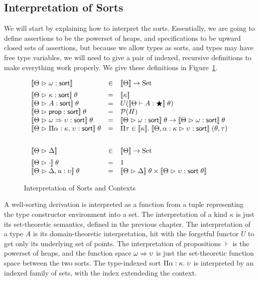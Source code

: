 \subsection{Interpretation of Sorts}

We will start by explaining how to interpret the sorts. Essentially,
we are going to define assertions to be the powerset of heaps, and
specifications to be upward closed sets of assertions, but because we
allow types as sorts, and types may have free type variables, we will
need to give a pair of indexed, recursive definitions to make
everything work properly. We give these definitions in
Figure~\ref{sort-interpretation}. 

\begin{figure}
\begin{displaymath}
  \begin{array}{lcl}
    \interp{\judgeSort{\omega}} & \in & \interp{\Theta} \to \mathrm{Set} \\[0.5em]
    \interp{\judgeSort{\kappa}} \;\theta
    & = & \interp{\kappa} 
    \\
    \interp{\judgeSort{A}}\;\theta
    & = & U(\interp{\judgeWK{A}{\bigstar}}\;\theta)
    \\
    \interp{\judgeSort{\assert}}\;\theta
    & = & \powerset{H}
    \\
    \interp{\judgeSort{\omega \To \upsilon}}\;\theta
    & = & \interp{\judgeSort{\omega}}\;\theta \to \interp{\judgeSort{\omega}}\;\theta
    \\
    \interp{\judgeSort{\forallsort{\alpha}{\kappa}{\upsilon}}}\;\theta
    & = & \Pi \tau \in \interp{\kappa}.\;\interp{\judgeSort[\Theta, \alpha:\kappa]{\upsilon}}\;(\theta,\tau)
    \\[2em]
    \interp{\judgeACtx{\Delta}} & \in & \interp{\Theta} \to \mathrm{Set} \\[0.5em]
    \interp{\judgeACtx{\cdot}}\;\theta & = & 1 \\
    \interp{\judgeACtx{\Delta, u:\upsilon}}\;\theta & = & \interp{\judgeACtx{\Delta}}\;\theta \times
                                                          \interp{\judgeSort{\upsilon}\;\theta}

  \end{array}
\end{displaymath}
\caption{Interpretation of Sorts and Contexts}
\label{sort-interpretation}  
\end{figure}

A well-sorting derivation is interpreted as a function from a tuple
representing the type constructor environment into a set. The
interpretation of a kind $\kappa$ is just its set-theoretic semantics,
defined in the previous chapter. The interpretation of a type $A$ is
its domain-theoretic interpretation, hit with the forgetful functor
$U$ to get only its underlying set of points.  The interpretation of
propositions $\assert$ is the powerset of heaps, and the function
space $\omega \Rightarrow \upsilon$ is just the set-theoretic function space
between the two sorts. The type-indexed sort
$\Pi {\alpha}:{\kappa}.\;{\upsilon}$ is interpreted by an indexed
family of sets, with the index extendeding the context.


